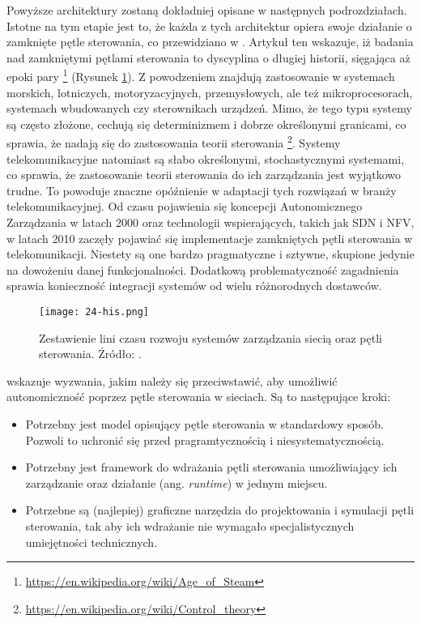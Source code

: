 Powyższe architektury zostaną dokładniej opisane w następnych podrozdziałach. Istotne na tym etapie jest to, że każda z tych architektur opiera swoje działanie o zamknięte pętle sterowania, co przewidziano w \cite{fallon2019}. Artykuł ten wskazuje, iż badania nad zamkniętymi pętlami sterowania to dyscyplina o długiej historii, sięgająca aż epoki pary \footnote{\url{https://en.wikipedia.org/wiki/Age_of_Steam}} (Rysunek \ref{fig:24-his}). Z powodzeniem znajdują zastosowanie w systemach morskich, lotniczych, motoryzacyjnych, przemysłowych, ale też mikroprocesorach, systemach wbudowanych czy sterownikach urządzeń. Mimo,  że tego typu systemy są często złożone, cechują się determinizmem i dobrze określonymi granicami, co sprawia, że nadają się do zastosowania teorii sterowania \footnote{\url{https://en.wikipedia.org/wiki/Control_theory}}. Systemy telekomunikacyjne natomiast są słabo określonymi, stochastycznymi systemami, co sprawia, że zastosowanie teorii sterowania do ich zarządzania jest wyjątkowo trudne. To powoduje znaczne opóźnienie w adaptacji tych rozwiązań w branży telekomunikacyjnej. Od czasu pojawienia się koncepcji Autonomicznego Zarządzania \cite{kephart2003} w latach 2000 oraz technologii wspierających, takich jak SDN i NFV, w latach 2010 zaczęły pojawiać się implementacje zamkniętych pętli sterowania w telekomunikacji. Niestety są one bardzo pragmatyczne i sztywne, skupione jedynie na dowożeniu danej funkcjonalności. Dodatkową problematyczność zagadnienia sprawia konieczność integracji systemów od wielu różnorodnych dostawców.

\begin{figure}[!htbp]
    \centering \texttt{[image: 24-his.png]}
    \caption{Zestawienie lini czasu rozwoju systemów zarządzania siecią oraz pętli sterowania. Źródło: \cite{fallon2019}.}\label{fig:24-his}
\end{figure}

\cite{fallon2019} wskazuje wyzwania, jakim należy się przeciwstawić, aby umożliwić autonomiczność poprzez pętle sterowania w sieciach. Są to następujące kroki:
\begin{itemize}\hypertarget{list:1}{}
    \item Potrzebny jest model opisujący pętle sterowania w standardowy sposób. Pozwoli to uchronić się przed pragramtycznością i niesystematycznością.
    \item Potrzebny jest framework do wdrażania pętli sterowania umożliwiający ich zarządzanie oraz działanie (ang. \textit{runtime}) w jednym miejscu.
    \item Potrzebne są (najlepiej) graficzne narzędzia do projektowania i symulacji pętli sterowania, tak aby ich wdrażanie nie wymagało specjalistycznych umiejętności technicznych.
\end{itemize}

